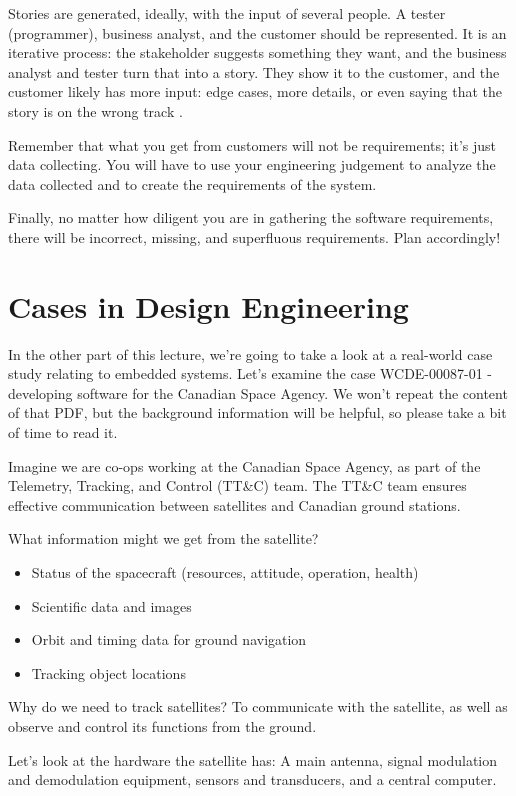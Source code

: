 Stories are generated, ideally, with the input of several people. A tester (programmer), business analyst, and the customer should be represented. It is an iterative process: the stakeholder suggests something they want, and the business analyst and tester turn that into a story. They show it to the customer, and the customer likely has more input: edge cases, more details, or even saying that the story is on the wrong track \cite{bdd2}.

Remember that what you get from customers will not be requirements; it's just data collecting. You will have to use your engineering judgement to analyze the data collected and to create the requirements of the system.

Finally, no matter how diligent you are in gathering the software requirements, there will be incorrect, missing, and superfluous requirements. Plan accordingly!




\section*{Cases in Design Engineering}
In the other part of this lecture, we're going to take a look at a real-world case study relating to embedded systems. Let's examine the case WCDE-00087-01 - developing software for the Canadian Space Agency. We won't repeat the content of that PDF, but the background information will be helpful, so please take a bit of time to read it.

Imagine we are co-ops working at the Canadian Space Agency, as part of the Telemetry, Tracking, and Control (TT\&C) team. The TT\&C team ensures effective communication between satellites and Canadian ground stations.

What information might we get from the satellite?

\begin{itemize}
	\item Status of the spacecraft (resources, attitude, operation, health)
	\item Scientific data and images
	\item Orbit and timing data for ground navigation
	\item Tracking object locations
\end{itemize}

Why do we need to track satellites? To communicate with the satellite, as well as observe and control its functions from the ground.

Let's look at the hardware the satellite has: A main antenna, signal modulation and demodulation equipment, sensors and transducers, and a central computer.


